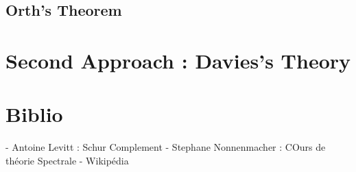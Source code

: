 \documentclass[12pt,openany,a4paper, titlepage]{article}
\theoremstyle{definition}
\theoremstyle{definition}
\theoremstyle{definition}
\theoremstyle{definition}
\theoremstyle{definition}
\theoremstyle{definition}
\begin{document}
\subsection{Orth's Theorem}

\section{Second Approach : Davies's Theory}





\newpage

\appendix
\appendixpage
\addappheadtotoc

\section{Biblio}

- Antoine Levitt : Schur Complement
- Stephane Nonnenmacher : COurs de théorie Spectrale
- Wikipédia %
\end{document}
